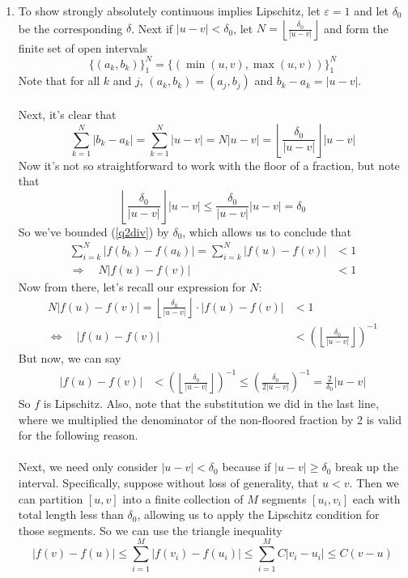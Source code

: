 \documentclass[12pt]{article}
\theoremstyle{plain}
\theoremstyle{definition}
\theoremstyle{remark}
\begin{document}
\begin{enumerate}
\begin{enumerate}
\begin{enumerate}
\item To show strongly absolutely continuous implies Lipschitz, let $\varepsilon=1$ and let $\delta_0$ be the corresponding $\delta$. Next if $|u-v|<\delta_0$, let $N=\left\lfloor{\frac{\delta_0}{|u-v|}}\right\rfloor$ and form the finite set of open intervals
\[
    \{(a_k,b_k)\}_1^N
    = \{(\min(u,v),\max(u,v))\}_1^N
\]
Note that for all $k$ and $j$, $(a_k,b_k)=(a_j,b_j)$ and $b_k-a_k=|u-v|$. 
\\
\\
Next, it's clear that
\begin{equation}
\label{q2div}
    \sum_{k=1}^N |b_k-a_k| =
    \sum_{k=1}^N |u-v|  = N|u-v| =
    \left\lfloor{\frac{\delta_0}{|u-v|}}\right\rfloor
    |u-v|
\end{equation}
Now it's not so straightforward to work with the floor of a fraction, but note that 
\begin{equation}
    \label{q2div.trick}
    \left\lfloor{\frac{\delta_0}{|u-v|}}\right\rfloor|u-v|
    \leq \frac{\delta_0}{|u-v|}|u-v| = \delta_0
\end{equation}
So we've bounded (\ref{q2div}) by $\delta_0$, which allows us to conclude that
\begin{align*}
    \sum_{i=k}^N |f(b_k)-f(a_k)|
    = \sum_{i=k}^N |f(u)-f(v)| &< 1 \\
    \Rightarrow\quad
    N |f(u)-f(v)| &< 1
\end{align*}
Now from there, let's recall our expression for $N$:
\begin{align*}
    N |f(u)-f(v)|  = 
    \left\lfloor{\frac{\delta_0}{|u-v|}}\right\rfloor
    \cdot |f(u)-f(v)| &< 1 \\
    \Leftrightarrow\quad
    |f(u)-f(v)|
    &< \left(
    \left\lfloor{\frac{\delta_0}{|u-v|}}\right\rfloor\right)^{-1}
\end{align*}
But now, we can say
\begin{align*}
    |f(u)-f(v)|
    &< \left(
    \left\lfloor{\frac{\delta_0}{|u-v|}}\right\rfloor\right)^{-1}
    \leq 
    \left(\frac{\delta_0}{2|u-v|}\right)^{-1}
    = \frac{2}{\delta_0}|u-v|
\end{align*}
So $f$ is Lipschitz. Also, note that the substitution we did in the last line, where we multiplied the denominator of the non-floored fraction by 2 is valid for the following reason. 
\\
\\
Next, we need only consider $|u-v|<\delta_0$ because if $|u-v|\geq\delta_0$ break up the interval. Specifically, suppose without loss of generality, that $u<v$. Then we can partition $[u,v]$ into a finite collection of $M$ segments $[u_i, v_i]$ each with total length less than $\delta_0$, allowing us to apply the Lipschitz condition for those segments.  So we can use the triangle inequality
\[
    |f(v)-f(u)| \leq \sum_{i=1}^M |f(v_i)-f(u_i)| \leq \sum_{i=1}^M C|v_i-u_i| 
    \leq C(v-u)
\]


\end{enumerate}
\end{enumerate}
\end{enumerate}
\end{document}
